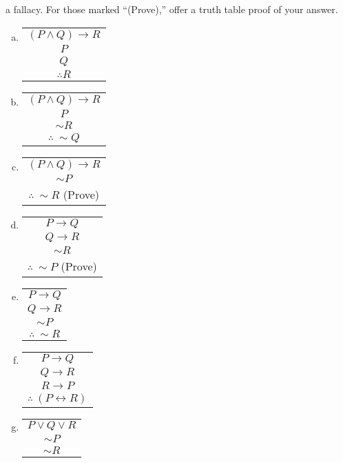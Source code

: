 \begin{multicols}{2}
\begin{enumerate}
a fallacy.  For those marked ``(Prove),'' offer a truth table
proof of your answer.
\begin{enumerate}[(a)]
\item \begin{tabular}{c}$(P\wedge Q)\longrightarrow R$\\
                         $P$\\$Q$\\\hline$\therefore R$
      \end{tabular}\bigskip
\item \begin{tabular}{c}$(P\wedge Q)\longrightarrow R$\\
                        $P$\\$\sim R$\\\hline$\therefore\ \sim Q$
      \end{tabular}\bigskip
\item \begin{tabular}{c}$(P\wedge Q)\longrightarrow R$\\
                        $\sim P$\\\hline$\therefore\ \sim R$  (Prove)
      \end{tabular}\bigskip
\item \begin{tabular}{c}$P\longrightarrow Q$\\$Q\longrightarrow R$\\
                        $\sim R$\\\hline$\therefore\ \sim P$ (Prove)
      \end{tabular}\bigskip
\item \begin{tabular}{c}$P\longrightarrow Q$\\$Q\longrightarrow R$\\
                        $\sim P$\\\hline$\therefore\ \sim R$
      \end{tabular}\bigskip
\item \begin{tabular}{c}$P\longrightarrow Q$\\$Q\longrightarrow R$\\
                        $R\longrightarrow P$\\\hline
                        $\therefore\ (P\longleftrightarrow R)$
      \end{tabular}\bigskip
\item \begin{tabular}{c}$P\vee Q\vee R$\\$\sim P$\\$\sim R$\\\hline

\end{tabular}
\end{enumerate}
\end{enumerate}
\end{multicols}
